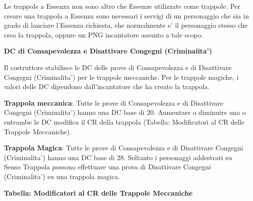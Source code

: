 \documentclass[a4paper,11pt,twoside,openany]{dndbook}
\begin{document}
{Le trappole a Essenza non sono altro che Essenze utilizzate come trappole. Per creare una trappola a Essenza sono necessari i servigi di un personaggio che sia in grado di lanciare l'Essenza richiesta, che normalmente e' il personaggio stesso che crea la trappola, oppure un PNG incantatore assunto a tale scopo.

\textbf{DC di Consapevolezza e Disattivare Congegni (Criminalita')}

Il costruttore stabilisce le DC delle prove di Consapevolezza e di Disattivare Congegni (Criminalita') per le trappole meccaniche. Per le trappole magiche, i valori delle DC dipendono dall'incantatore che ha creato la trappola.

\textbf{Trappola meccanica}: Tutte le prove di Consapevolezza e di Disattivare Congegni (Criminalita') hanno una DC base di 20. Aumentare o diminuire una o entrambe le DC modifica il CR della trappola (Tabella: Modificatori al CR delle Trappole Meccaniche). 

\textbf{Trappola Magica}: Tutte le prove di Consapevolezza e di Disattivare Congegni (Criminalita') hanno una DC base di 28. Soltanto i personaggi addestrati su Senso Trappola possono effettuare una prova di Disattivare Congegni (Criminalita') su una trappola magica.

\pagebreak

\textbf{Tabella: Modificatori al CR delle Trappole Meccaniche}


}
\end{document}
